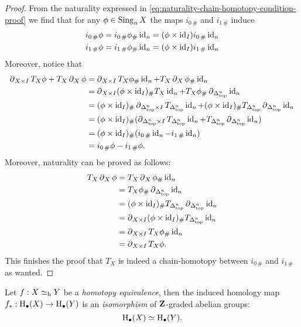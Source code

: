 \begin{proof}
From the naturality expressed in
\cref{eq:naturality-chain-homotopy-condition-proof} we find that for any \(\phi
\in \operatorname{Sing}_n X\) the maps \(i_{0\, \#}\) and \(i_{1\, \#}\) induce
\begin{align*}
  i_{0\, \#} \phi
  &= i_{0\, \#} \phi_{\#} \operatorname{id}_n
    = (\phi \times \operatorname{id}_I) i_{0\, \#} \operatorname{id}_n \\
  i_{1\, \#} \phi
  &= i_{1\, \#} \phi_{\#} \operatorname{id}_n
    = (\phi \times \operatorname{id}_I) i_{1\, \#} \operatorname{id}_n \\
\end{align*}
Moreover, notice that
\begin{align*}
  \operatorname{\partial}_{X \times I} T_X \phi + T_X \operatorname{\partial}_X \phi
  &= \operatorname{\partial}_{X \times I} T_X \phi_{\#} \operatorname{id}_n
     + T_X \operatorname{\partial}_X \phi_{\#} \operatorname{id}_n \\
  &= \operatorname{\partial}_{X \times I} (\phi \times \operatorname{id}_I)_{\#} T_X \operatorname{id}_n
    + T_X \phi_{\#} \operatorname{\partial}_{\Delta_{\text{top}}^n} \operatorname{id}_n \\
  &= (\phi \times \operatorname{id}_I)_{\#} \operatorname{\partial}_{\Delta_{\text{top}}^n \times I} T_{\Delta_{\text{top}}^n} \operatorname{id}_n
    + (\phi \times \operatorname{id}_I)_{\#} T_{\Delta_{\text{top}}^n} \operatorname{\partial}_{\Delta_{\text{top}}^n} \operatorname{id}_n \\
  &= (\phi \times \operatorname{id}_I)_{\#} (\operatorname{\partial}_{\Delta_{\text{top}}^n \times I} T_{\Delta_{\text{top}}^n} \operatorname{id}_n
    + T_{\Delta_{\text{top}}^n} \operatorname{\partial}_{\Delta_{\text{top}}^n} \operatorname{id}_n) \\
  &= (\phi \times \operatorname{id}_I)_{\#} (i_{0\, \#} \operatorname{id}_n - i_{1\, \#} \operatorname{id}_n) \\
  &= i_{0\, \#} \phi - i_{1\, \#} \phi.
\end{align*}
Moreover, naturality can be proved as follows:
\begin{align*}
  T_X \operatorname{\partial}_X \phi
  &= T_X \operatorname{\partial}_X \phi_{\#} \operatorname{id}_n \\
  &= T_X \phi_{\#} \operatorname{\partial}_{\Delta_{\text{top}}^n} \operatorname{id}_n \\
  &= (\phi \times \operatorname{id}_I)_{\#} T_{\Delta_{\text{top}}^n} \operatorname{\partial}_{\Delta_{\text{top}}^n} \operatorname{id}_n \\
  &= \operatorname{\partial}_{X \times I} (\phi \times \operatorname{id}_I)_{\#} T_{\Delta_{\text{top}}^n} \operatorname{id}_n \\
  &= \operatorname{\partial}_{X \times I} T_X \phi_{\#} \operatorname{id}_n \\
  &= \operatorname{\partial}_{X \times I} T_X \phi.
\end{align*}
This finishes the proof that \(T_X\) is indeed a chain-homotopy between
\(i_{0\, \#}\) and \(i_{1\, \#}\) as wanted.
\end{proof}

\begin{corollary}
\label{cor:htpy-equiv-iso-homology}
Let \(f: X \simeq_{\text{h}} Y\) be a \emph{homotopy equivalence}, then the induced
homology map \(f_{*}: \operatorname{H}_{\bullet}(X) \to \operatorname{H}_{\bullet}(Y)\) is an
\emph{isomorphism} of \(\mathbf{Z}\)-graded abelian groups:
\[
\operatorname{H}_{\bullet}(X) \simeq \operatorname{H}_{\bullet}(Y).
\]
\end{corollary}

